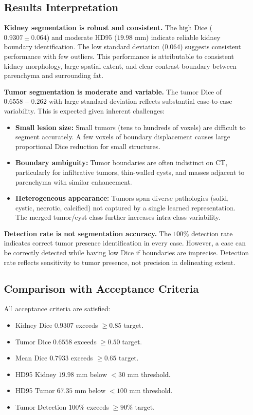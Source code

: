 \subsection{Results Interpretation}

\textbf{Kidney segmentation is robust and consistent.} The high Dice ($0.9307 \pm 0.064$) and moderate HD95 ($19.98$ mm) indicate reliable kidney boundary identification. The low standard deviation ($0.064$) suggests consistent performance with few outliers. This performance is attributable to consistent kidney morphology, large spatial extent, and clear contrast boundary between parenchyma and surrounding fat.

\textbf{Tumor segmentation is moderate and variable.} The tumor Dice of $0.6558 \pm 0.262$ with large standard deviation reflects substantial case-to-case variability. This is expected given inherent challenges:

\begin{itemize}
    \item \textbf{Small lesion size:} Small tumors (tens to hundreds of voxels) are difficult to segment accurately. A few voxels of boundary displacement causes large proportional Dice reduction for small structures.
    \item \textbf{Boundary ambiguity:} Tumor boundaries are often indistinct on CT, particularly for infiltrative tumors, thin-walled cysts, and masses adjacent to parenchyma with similar enhancement.
    \item \textbf{Heterogeneous appearance:} Tumors span diverse pathologies (solid, cystic, necrotic, calcified) not captured by a single learned representation. The merged tumor/cyst class further increases intra-class variability.
\end{itemize}

\textbf{Detection rate is not segmentation accuracy.} The $100\%$ detection rate indicates correct tumor presence identification in every case. However, a case can be correctly detected while having low Dice if boundaries are imprecise. Detection rate reflects sensitivity to tumor presence, not precision in delineating extent.

\subsection{Comparison with Acceptance Criteria}

All acceptance criteria are satisfied:
\begin{itemize}
    \item Kidney Dice $0.9307$ exceeds $\geq 0.85$ target.
    \item Tumor Dice $0.6558$ exceeds $\geq 0.50$ target.
    \item Mean Dice $0.7933$ exceeds $\geq 0.65$ target.
    \item HD95 Kidney $19.98$ mm below $< 30$ mm threshold.
    \item HD95 Tumor $67.35$ mm below $< 100$ mm threshold.
    \item Tumor Detection $100\%$ exceeds $\geq 90\%$ target.
\end{itemize}

